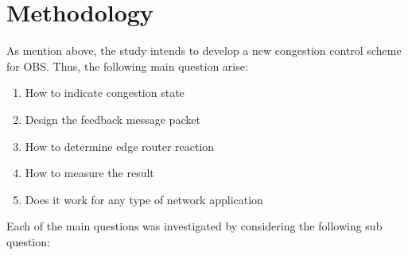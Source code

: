 \section{Methodology}
As mention above, the study intends to develop a new congestion control scheme for OBS. Thus, the following main question arise:

\begin{enumerate}

    \item How to indicate congestion state
    \item Design the feedback message packet
    \item How to determine edge router reaction
    \item How to measure the result 
    \item Does it work for any type of network application

\end{enumerate}

Each of the main questions was investigated by considering the following sub question:


